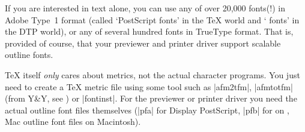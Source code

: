 
If you are interested in text alone, you can use any of over 20,000
fonts(!) in Adobe Type~1 format (called `PostScript fonts' in the
\TeX{} world and ` fonts' in the DTP world), or any of several
hundred fonts in TrueType format.  That is, provided of course, that
your previewer and printer driver support scalable outline fonts.

\TeX{} itself \emph{only} cares about metrics, not the actual
character programs.  You just need to create a \TeX{} metric file
 using some tool such as \ProgName|afm2tfm|, \ProgName|afmtotfm|
(from Y\&Y, see )
or \ProgName|fontinst|.  For the previewer or printer driver you need the
actual outline font files themselves (|pfa| for Display PostScript, |pfb|
for  on  , Mac outline font files on Macintosh).

